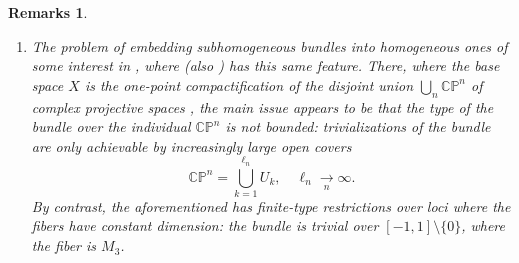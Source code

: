 \documentclass[11pt,leqno]{article}
\theoremstyle{plain}
\theoremstyle{plain}
\theoremstyle{plain}
\newtheorem{remark}[lemma]{Remark}
\newtheorem{remarks}[lemma]{Remarks}
\numberwithin{equation}{section}
\theoremstyle{nonumberplain}
\newcommand\bC{{\mathbb C}}
\newcommand\bP{{\mathbb P}}
\newcommand\1{{\bf 1}}
\begin{document}
\begin{remarks}
\begin{enumerate}[(1),wide]
  \item  The problem of embedding subhomogeneous bundles into homogeneous ones of some interest in \cite{bg_cx-exp}, where \cite[Example 3.6]{bg_cx-exp} (also \cite[Example 3.5]{zbMATH05172034}) has this same feature. There, where the base space $X$ is the one-point compactification of the disjoint union $\bigcup_{n}\bC\bP^n$ of {\it complex projective spaces} \cite[\S 14.3]{ms-cc}, the main issue appears to be that the {\it type} \cite[Definition 3.5.7]{hus_fib} of the bundle over the individual $\bC\bP^n$ is not bounded: trivializations of the bundle are only achievable by increasingly large open covers
    \begin{equation*}
      \bC\bP^n = \bigcup_{k=1}^{\ell_n}U_k
      ,\quad
      \ell_n\xrightarrow[n]{\quad}\infty.
    \end{equation*}
    By contrast, the aforementioned \cite[Example 2.2]{2409.03531v1} has finite-type restrictions over loci where the fibers have constant dimension: the bundle is trivial over $[-1,1]\setminus \{0\}$, where the fiber is $M_3$.
  \end{enumerate}
\end{remarks}

\end{document}
